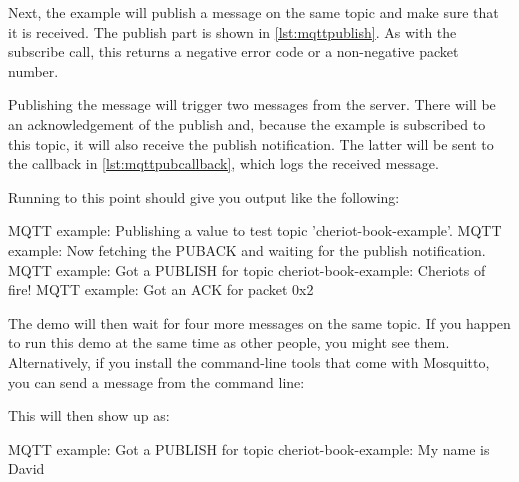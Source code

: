 {Next, the example will publish a message on the same topic and make sure that it is received.
The publish part is shown in \ref{lst:mqttpublish}.
As with the subscribe call, this returns a negative error code or a non-negative packet number.

\codelisting[filename=examples/mqtt/mqtt.cc,marker=publish,label=lst:mqttpublish,caption="Publishing to an MQTT topic."]{}

Publishing the message will trigger two messages from the server.
There will be an acknowledgement of the publish and, because the example is subscribed to this topic, it will also receive the publish notification.
The latter will be sent to the callback in \ref{lst:mqttpubcallback}, which logs the received message.

\codelisting[filename=examples/mqtt/mqtt.cc,marker=publish_callback,label=lst:mqttpubcallback,caption="Callback for receiving published MQTT messages."]{}

Running to this point should give you output like the following:

\begin{console}
MQTT example: Publishing a value to test topic 'cheriot-book-example'.
MQTT example: Now fetching the PUBACK and waiting for the publish notification.
MQTT example: Got a PUBLISH for topic cheriot-book-example: Cheriots of fire!
MQTT example: Got an ACK for packet 0x2
\end{console}

The demo will then wait for four more messages on the same topic.
If you happen to run this demo at the same time as other people, you might see them.
Alternatively, if you install the command-line tools that come with Mosquitto, you can send a message from the command line:


This will then show up as:

\begin{console}
MQTT example: Got a PUBLISH for topic cheriot-book-example: My name is David
\end{console}

}
